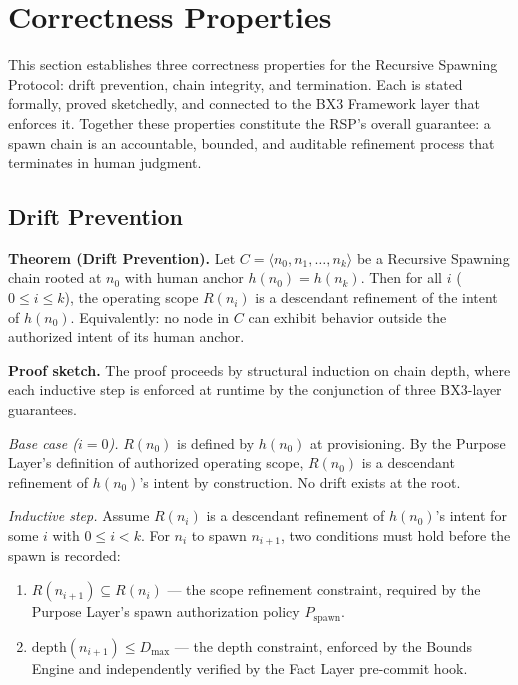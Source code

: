 \section{Correctness Properties}
\label{sec:rs-correctness}

This section establishes three correctness properties for the Recursive Spawning Protocol: drift prevention, chain integrity, and termination. Each is stated formally, proved sketchedly, and connected to the BX3 Framework layer that enforces it. Together these properties constitute the RSP's overall guarantee: a spawn chain is an accountable, bounded, and auditable refinement process that terminates in human judgment.

\subsection{Drift Prevention}
\label{sec:rs-drift-prevention}

\medskip
\noindent\textbf{Theorem (Drift Prevention).}
Let $C = \langle n_0, n_1, \ldots, n_k \rangle$ be a Recursive Spawning chain rooted at $n_0$ with human anchor $h(n_0) = h(n_k)$. Then for all $i$ ($0 \leq i \leq k$), the operating scope $R(n_i)$ is a descendant refinement of the intent of $h(n_0)$. Equivalently: no node in $C$ can exhibit behavior outside the authorized intent of its human anchor.

\medskip
\noindent\textbf{Proof sketch.} The proof proceeds by structural induction on chain depth, where each inductive step is enforced at runtime by the conjunction of three BX3-layer guarantees.

\medskip
\textit{Base case ($i=0$).}
$R(n_0)$ is defined by $h(n_0)$ at provisioning. By the Purpose Layer's definition of authorized operating scope, $R(n_0)$ is a descendant refinement of $h(n_0)$'s intent by construction. No drift exists at the root.

\medskip
\textit{Inductive step.}
Assume $R(n_i)$ is a descendant refinement of $h(n_0)$'s intent for some $i$ with $0 \leq i < k$. For $n_i$ to spawn $n_{i+1}$, two conditions must hold before the spawn is recorded:

\begin{enumerate}
  \item[(a)] $R(n_{i+1}) \subseteq R(n_i)$ — the scope refinement constraint, required by the Purpose Layer's spawn authorization policy $P_{\mathrm{spawn}}$.
  \item[(b)] $\mathrm{depth}(n_{i+1}) \leq D_{\mathrm{max}}$ — the depth constraint, enforced by the Bounds Engine and independently verified by the Fact Layer pre-commit hook.
\end{enumerate}

